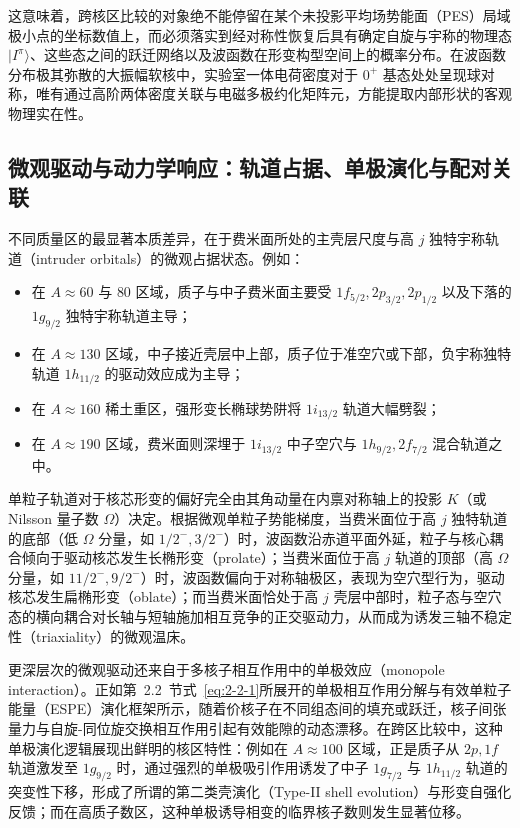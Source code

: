 这意味着，跨核区比较的对象绝不能停留在某个未投影平均场势能面（PES）局域极小点的坐标数值上，而必须落实到经对称性恢复后具有确定自旋与宇称的物理态 $|I^\pi\rangle$、这些态之间的跃迁网络以及波函数在形变构型空间上的概率分布。在波函数分布极其弥散的大振幅软核中，实验室一体电荷密度对于 $0^+$ 基态处处呈现球对称，唯有通过高阶两体密度关联与电磁多极约化矩阵元，方能提取内部形状的客观物理实在性\cite{poves-2020-limits-assigning-nuclear-shape}。

\subsection{微观驱动与动力学响应：轨道占据、单极演化与配对关联}\label{sec:4-1-2}

不同质量区的最显著本质差异，在于费米面所处的主壳层尺度与高 $j$ 独特宇称轨道（intruder orbitals）的微观占据状态。例如：
\begin{itemize}
\item 在 $A\approx 60$ 与 $80$ 区域，质子与中子费米面主要受 $1f_{5/2}, 2p_{3/2}, 2p_{1/2}$ 以及下落的 $1g_{9/2}$ 独特宇称轨道主导；
\item 在 $A\approx 130$ 区域，中子接近壳层中上部，质子位于准空穴或下部，负宇称独特轨道 $1h_{11/2}$ 的驱动效应成为主导；
\item 在 $A\approx 160$ 稀土重区，强形变长椭球势阱将 $1i_{13/2}$ 轨道大幅劈裂；
\item 在 $A\approx 190$ 区域，费米面则深埋于 $1i_{13/2}$ 中子空穴与 $1h_{9/2}, 2f_{7/2}$ 混合轨道之中。
\end{itemize}

单粒子轨道对于核芯形变的偏好完全由其角动量在内禀对称轴上的投影 $K$（或 Nilsson 量子数 $\Omega$）决定。根据微观单粒子势能梯度，当费米面位于高 $j$ 独特轨道的底部（低 $\Omega$ 分量，如 $1/2^-, 3/2^-$）时，波函数沿赤道平面外延，粒子与核心耦合倾向于驱动核芯发生长椭形变（prolate）；当费米面位于高 $j$ 轨道的顶部（高 $\Omega$ 分量，如 $11/2^-, 9/2^-$）时，波函数偏向于对称轴极区，表现为空穴型行为，驱动核芯发生扁椭形变（oblate）；而当费米面恰处于高 $j$ 壳层中部时，粒子态与空穴态的横向耦合对长轴与短轴施加相互竞争的正交驱动力，从而成为诱发三轴不稳定性（triaxiality）的微观温床\cite{book-bohr-mottelson-nuclear-structure-vol2}。

更深层次的微观驱动还来自于多核子相互作用中的单极效应（monopole interaction）。正如第~2.2~节式~\eqref{eq:2-2-1}所展开的单极相互作用分解与有效单粒子能量（ESPE）演化框架所示，随着价核子在不同组态间的填充或跃迁，核子间张量力与自旋-同位旋交换相互作用引起有效能隙的动态漂移\cite{doctoral-r1-g28-otsuka-2023-type-ii-shell-evolution}。在跨区比较中，这种单极演化逻辑展现出鲜明的核区特性：例如在 $A\approx 100$ 区域，正是质子从 $2p, 1f$ 轨道激发至 $1g_{9/2}$ 时，通过强烈的单极吸引作用诱发了中子 $1g_{7/2}$ 与 $1h_{11/2}$ 轨道的突变性下移，形成了所谓的第二类壳演化（Type-II shell evolution）与形变自强化反馈\cite{doctoral-r1-g28-togashi-2016-zr-mcsm-qpt}；而在高质子数区，这种单极诱导相变的临界核子数则发生显著位移。

